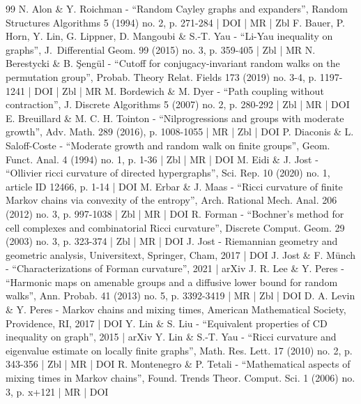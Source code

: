 \documentclass[10pt]{amsart}
\theoremstyle{definition}
\begin{document}
\begin{thebibliography}{99}
N. Alon \& Y. Roichman - “Random Cayley graphs and expanders”, Random Structures Algorithms 5 (1994) no. 2, p. 271-284 | DOI | MR | Zbl
F. Bauer, P. Horn, Y. Lin, G. Lippner, D. Mangoubi \& S.-T. Yau - “Li-Yau inequality on graphs”, J. Differential Geom. 99 (2015) no. 3, p. 359-405 | Zbl | MR
N. Berestycki \& B. Şengül - “Cutoff for conjugacy-invariant random walks on the permutation group”, Probab. Theory Relat. Fields 173 (2019) no. 3-4, p. 1197-1241 | DOI | Zbl | MR
M. Bordewich \& M. Dyer - “Path coupling without contraction”, J. Discrete Algorithms 5 (2007) no. 2, p. 280-292 | Zbl | MR | DOI
E. Breuillard \& M. C. H. Tointon - “Nilprogressions and groups with moderate growth”, Adv. Math. 289 (2016), p. 1008-1055 | MR | Zbl | DOI
P. Diaconis \& L. Saloff-Coste - “Moderate growth and random walk on finite groups”, Geom. Funct. Anal. 4 (1994) no. 1, p. 1-36 | Zbl | MR | DOI
M. Eidi \& J. Jost - “Ollivier ricci curvature of directed hypergraphs”, Sci. Rep. 10 (2020) no. 1, article ID 12466, p. 1-14 | DOI
M. Erbar \& J. Maas - “Ricci curvature of finite Markov chains via convexity of the entropy”, Arch. Rational Mech. Anal. 206 (2012) no. 3, p. 997-1038 | Zbl | MR | DOI
R. Forman - “Bochner’s method for cell complexes and combinatorial Ricci curvature”, Discrete Comput. Geom. 29 (2003) no. 3, p. 323-374 | Zbl | MR | DOI
J. Jost - Riemannian geometry and geometric analysis, Universitext, Springer, Cham, 2017 | DOI
J. Jost \& F. Münch - “Characterizations of Forman curvature”, 2021 | arXiv
J. R. Lee \& Y. Peres - “Harmonic maps on amenable groups and a diffusive lower bound for random walks”, Ann. Probab. 41 (2013) no. 5, p. 3392-3419 | MR | Zbl | DOI
D. A. Levin \& Y. Peres - Markov chains and mixing times, American Mathematical Society, Providence, RI, 2017 | DOI
Y. Lin \& S. Liu - “Equivalent properties of CD inequality on graph”, 2015 | arXiv
Y. Lin \& S.-T. Yau - “Ricci curvature and eigenvalue estimate on locally finite graphs”, Math. Res. Lett. 17 (2010) no. 2, p. 343-356 | Zbl | MR | DOI
R. Montenegro \& P. Tetali - “Mathematical aspects of mixing times in Markov chains”, Found. Trends Theor. Comput. Sci. 1 (2006) no. 3, p. x+121 | MR | DOI

\end{thebibliography}
\end{document}
